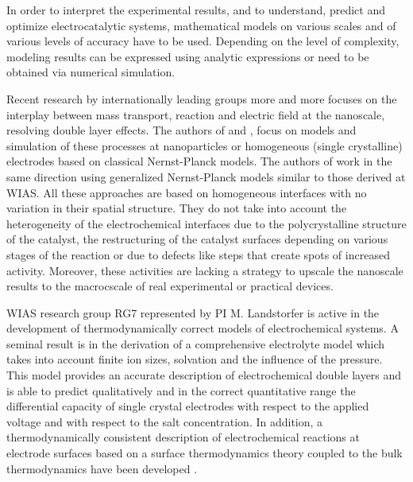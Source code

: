 \documentclass[a4paper,10pt]{article}
\begin{document}
In order  to interpret  the experimental  results, and  to understand,
predict and optimize electrocatalytic  systems, mathematical models on various scales and of
various  levels of  accuracy have to be used. Depending  on the  level of  complexity,
modeling  results  can  be  expressed using  analytic  expressions  or
need to be obtained via numerical simulation.


Recent research by  internationally leading groups  more and
more focuses  on the  interplay between  mass transport,  reaction and
electric    field    at    the     nanoscale, resolving double layer effects.
The    authors    of
\cite{lin2019understanding}          and         \cite{tan2018double},
\cite{eden2019modeling} focus on models and simulation of these processes
at nanoparticles or homogeneous  (single crystalline) electrodes based
on     classical    Nernst-Planck     models.    The     authors    of
\cite{bohra2019modeling} work in the  same direction using generalized
Nernst-Planck models similar to those derived at WIAS.
All these approaches are based on homogeneous interfaces with no variation in their
spatial  structure. They  do   not  take  into  account  the
heterogeneity   of   the   electrochemical  interfaces   due   to   the
polycrystalline structure  of the catalyst, the restructuring  of the
catalyst surfaces depending  on various stages of the  reaction or due
to defects like steps that create spots of increased activity.
Moreover, these activities are lacking a strategy to upscale the nanoscale
results to the macrocscale of real experimental or practical devices.

WIAS research group  RG7 represented by PI M. Landstorfer is active
in the development of thermodynamically correct models of electrochemical systems.
A seminal result is in the derivation of a comprehensive electrolyte model which takes into account finite
ion sizes, solvation and the influence of the pressure.
This model provides an accurate description of electrochemical double
layers  and is  able to  predict qualitatively and in the correct quantitative range the
differential capacity of single crystal electrodes with respect to the applied voltage and
with respect to the salt concentration. In addition,  a thermodynamically consistent
description of electrochemical reactions at electrode surfaces based on a surface thermodynamics
theory coupled to the bulk thermodynamics have been developed
\cite{DGM2013,DGL2014,Landstorfer2016187,landstorfer2017boundary}.
\end{document}
